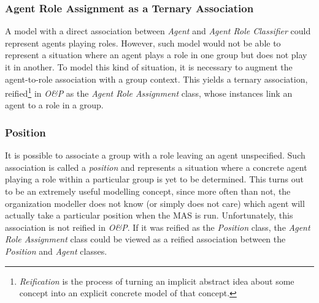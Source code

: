 \subsubsection*{Agent Role Assignment as a Ternary Association}

A model with a direct association between \textit{Agent} and \textit{Agent Role Classifier} could represent agents playing roles.
However, such model would not be able to represent a situation where an agent plays a role in one group but does not play it in another.
To model this kind of situation, it is necessary to augment the agent-to-role association with a group context.
This yields a ternary association, reified\footnote{\textit{Reification} is the process of turning an implicit abstract idea about some concept into an explicit concrete model of that concept.} in \textit{O\&P} as the \textit{Agent Role Assignment} class, whose instances link an agent to a role in a group.

\subsubsection*{Position}

It is possible to associate a group with a role leaving an agent unspecified.
Such association is called a \textit{position} and represents a situation where a concrete agent playing a role within a particular group is yet to be determined.
This turns out to be an extremely useful modelling concept, since more often than not, the organization modeller does not know (or simply does not care) which agent will actually take a particular position when the MAS is run.
Unfortunately, this association is not reified in \textit{O\&P}.
If it was reified as the \textit{Position} class, the \textit{Agent Role Assignment} class could be viewed as a reified association between the \textit{Position} and \textit{Agent} classes.
